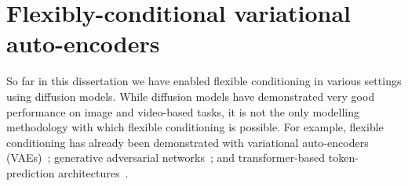 \chapter{Flexibly-conditional variational auto-encoders}
\label{ch:cigcvae}


So far in this dissertation we have enabled flexible conditioning in various settings using diffusion models. While diffusion models have demonstrated very good performance on image and video-based tasks, it is not the only modelling methodology with which flexible conditioning is possible. For example, flexible conditioning has already been demonstrated with variational auto-encoders (VAEs)~\citep{ivanov2018variational}; generative adversarial networks~\citep{goodfellow2014generative}; and transformer-based token-prediction architectures~\citep{chang2022maskgit}. 

